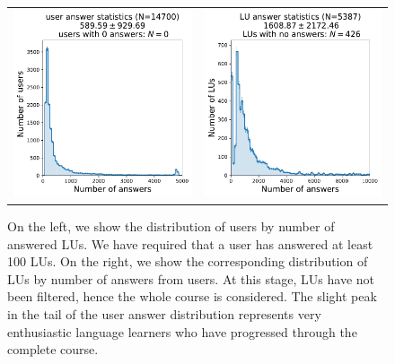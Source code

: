 \begin{figure}[ht]
\centering
\begin{tabular}{cc}
\includegraphics[width=0.5\linewidth]{figures/lingvist/user_answer_distribution.pdf} &
\includegraphics[width=0.5\linewidth]{figures/lingvist/lu_answer_distribution.pdf} \\
\end{tabular}
\caption[Distributions of guesses by LU and user]{On the left, we show the distribution of users by number of answered LUs. We have required that a user has answered at least 100 LUs. On the right, we show the corresponding distribution of LUs by number of answers from users. At this stage, LUs have not been filtered, hence the whole course is considered. The slight peak in the tail of the user answer distribution represents very enthusiastic language learners who have progressed through the complete course.} 
\label{fig:user_lu_distribution} 
\end{figure} 

